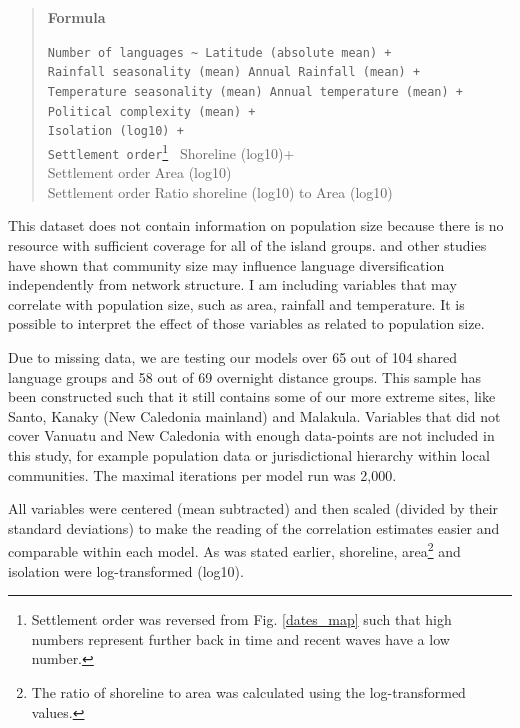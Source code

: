 \documentclass[a4paper,10pt]{article} %
\begin{document}
\begin{quotation}
\textbf{Formula} 

\texttt{Number of languages \textasciitilde{} Latitude (absolute mean) + \\
Rainfall seasonality (mean) \textasteriskcentered{}   Annual Rainfall (mean) + \\
Temperature seasonality (mean) \textasteriskcentered{}   Annual temperature (mean)  + \\
Political complexity (mean) + \\
Isolation (log10) + \\ 
Settlement order}\footnote{Settlement order was reversed from Fig. \ref{dates_map} such that high \\ numbers represent further back in time and recent waves have a low number.}\texttt{\textasteriskcentered{} }  Shoreline (log10)+ \\
Settlement order \textasteriskcentered{}   Area (log10) \\ 
Settlement order \textasteriskcentered{}  Ratio shoreline (log10) to Area (log10) \\
\end{quotation}

This dataset does not contain information on population size because there is no resource with sufficient coverage for all of the island groups. \citet{raviv2019larger} and other studies have shown that community size may influence language diversification independently from network structure. I am including variables that may correlate with population size, such as area, rainfall and temperature. It is possible to interpret the effect of those variables as related to population size.

Due to missing data, we are testing our models over 65 out of 104 shared language groups and 58 out of 69 overnight distance groups. This sample has been constructed such that it still contains some of our more extreme sites, like Santo, Kanaky (New Caledonia mainland) and Malakula. Variables that did not cover Vanuatu and New Caledonia with enough data-points are not included in this study, for example population data or jurisdictional hierarchy within local communities. The maximal iterations per model run was 2,000.

All variables were centered (mean subtracted) and then scaled (divided by their standard deviations) to make the reading of the correlation estimates easier and comparable within each model. As was stated earlier, shoreline, area\footnote{The ratio of shoreline to area was calculated using the log-transformed values.} and isolation were log-transformed (log10).
\end{document}
